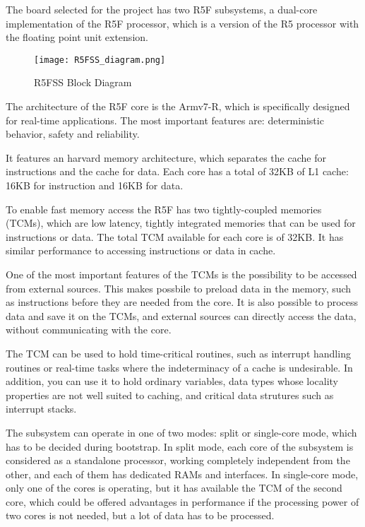 The board selected for the project has two R5F subsystems, a dual-core
implementation of the R5F processor, which is a version of the R5 processor
with the floating point unit extension.

\begin{figure}[ht]
    \centering
    \texttt{[image: R5FSS\_diagram.png]}
    \caption{R5FSS Block Diagram}
\end{figure}

The architecture of the R5F core is the Armv7-R, which is specifically designed
for real-time applications.
The most important features are: deterministic behavior, safety and
reliability.

It features an harvard memory architecture, which separates the cache for
instructions and the cache for data.
Each core has a total of 32KB of L1 cache: 16KB for instruction and 16KB for
data.

To enable fast memory access the R5F has two tightly-coupled memories (TCMs),
which are low latency, tightly integrated memories that can be used for
instructions or data. The total TCM available for each core is of 32KB.
It has similar performance to accessing instructions or data in cache.
\cite{Technical_reference_AM64}

One of the most important features of the TCMs is the possibility to be
accessed from external sources. This makes possbile to preload data in the
memory, such as instructions before they are needed from the core.
It is also possible to process data and save it on the TCMs, and external
sources can directly access the data, without communicating with the core.

The TCM can be used to hold time-critical routines, such as interrupt
handling routines or real-time tasks where the indeterminacy of a cache is
undesirable. In addition, you can use it to hold ordinary variables, data types
whose locality properties are not well suited to caching, and critical data
strutures such as interrupt stacks. \cite{TCM_documentation}

The subsystem can operate in one of two modes: split or single-core mode, which
has to be decided during bootstrap.
In split mode, each core of the subsystem is considered as a standalone
processor, working completely independent from the other, and each of them has
dedicated RAMs and interfaces.
In single-core mode, only one of the cores is operating, but it has available
the TCM of the second core, which could be offered advantages in performance if
the processing power of two cores is not needed, but a lot of data has to be
processed. 

